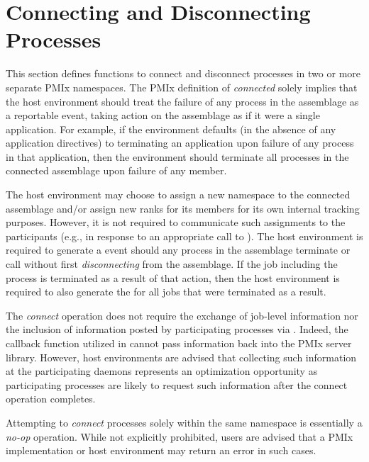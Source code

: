 \section{Connecting and Disconnecting Processes}
\label{chap:api_proc_mgmt:connect}

This section defines functions to connect and disconnect processes in two or more separate \ac{PMIx} namespaces. The \ac{PMIx} definition of \textit{connected} solely implies that the host environment should treat the failure of any process in the assemblage as a reportable event, taking action on the assemblage as if it were a single application. For example, if the environment defaults (in the absence of any application directives) to terminating an application upon failure of any process in that application, then the environment should terminate all processes in the connected assemblage upon failure of any member.

The host environment may choose to assign a new namespace to the connected assemblage and/or assign new ranks for its members for its own internal tracking purposes. However, it is not required to communicate such assignments to the participants (e.g., in response to an appropriate call to ). The host environment is required to generate a  event should any process in the assemblage terminate or call  without first \textit{disconnecting} from the assemblage. If the job including the process is terminated as a result of that action, then the host environment is required to also generate the  for all jobs that were terminated as a result.

\advicermstart
The \textit{connect} operation does not require the exchange of job-level information nor the inclusion of information posted by  participating processes via . Indeed, the callback function utilized in  cannot pass information back into the \ac{PMIx} server library. However, host environments are advised that collecting such information at the participating daemons represents an optimization opportunity as participating processes are likely to request such information after the connect operation completes.
\advicermend

\adviceuserstart
Attempting to \textit{connect} processes solely within the same namespace is essentially a \textit{no-op} operation. While not explicitly prohibited, users are advised that a \ac{PMIx} implementation or host environment may return an error in such cases.

